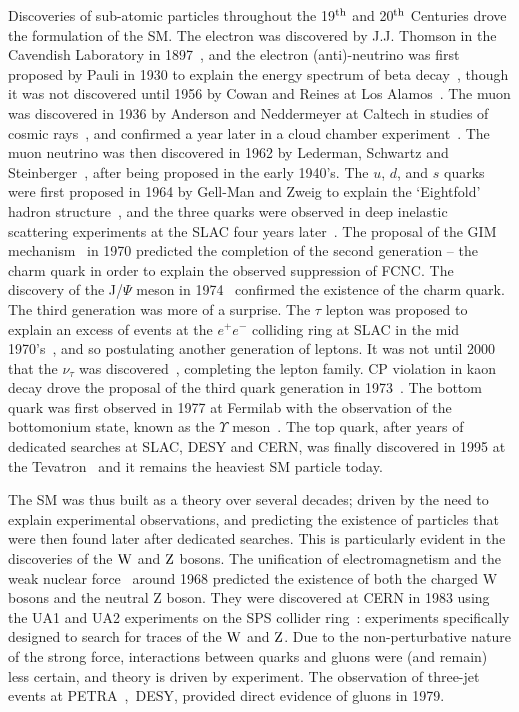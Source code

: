 %
Discoveries of sub-atomic particles throughout the 19$^{\rm th}$ and 20$^{\rm th}$ Centuries drove the formulation of the \ac{SM}.
The electron was discovered by J.J. Thomson in the Cavendish Laboratory in 1897~\cite{JJThomson}, and the electron (anti)-neutrino was first proposed by Pauli in 1930 to explain the energy spectrum of beta decay~\cite{PauliLetter}, though it was not discovered until 1956 by Cowan and Reines at Los Alamos~\cite{CowanReines}.
The muon was discovered in 1936 by Anderson and Neddermeyer at Caltech in studies of cosmic rays~\cite{muon1}, and confirmed a year later in a cloud chamber experiment~\cite{muon2}.
The muon neutrino was then discovered in 1962 by Lederman, Schwartz and Steinberger~\cite{muonNeutrino}, after being proposed in the early 1940's.
The $u$, $d$, and $s$ quarks were first proposed in 1964 by Gell-Man and Zweig to explain the `Eightfold' hadron structure~\cite{GellMann:1964nj,Zweig:1964jf},
and the three quarks were observed in deep inelastic scattering experiments at the \ac{SLAC} four years later~\cite{SLAC1,SLAC2}.
The proposal of the GIM mechanism~\cite{PhysRevD.2.1285} in 1970 predicted the completion of the second generation -- the charm quark in order to explain the observed suppression of \ac{FCNC}.
The discovery of the J/$\Psi$ meson in 1974~\cite{jpsi1,jpsi2} confirmed the existence of the charm quark.
%
The third generation was more of a surprise. 
The $\tau$ lepton was proposed to explain an excess of events at the $e^{+}e^{-}$ colliding ring at \ac{SLAC} in the mid 1970's~\cite{tauDiscovery}, and so postulating another generation of leptons. 
It was not until 2000 that the $\nu_\tau$ was discovered~\cite{tauNeutrino}, completing the lepton family. 
CP violation in kaon decay drove the proposal of the third quark generation in 1973~\cite{Kobayashi01021973}.
The bottom quark was first observed in 1977 at Fermilab with the observation of the bottomonium state, known as the $\Upsilon$ meson~\cite{bottomonium}. 
The top quark, after years of dedicated searches at \ac{SLAC}, \ac{DESY} and \ac{CERN}, was finally discovered in 1995 at the Tevatron~\cite{topquark:CDF,topquark:D0} and it remains the heaviest \ac{SM} particle today.

%
The \ac{SM} was thus built as a theory over several decades; driven by the need to explain experimental observations, and predicting the existence of particles that were then found later after dedicated searches. 
This is particularly evident in the discoveries of the $\mathrm{W}$ and $\mathrm{Z}$ bosons. 
The unification of electromagnetism and the weak nuclear force~\cite{PhysRevLett.19.1264,Glashow:1961tr,Salam:1968rm} around 1968 predicted the existence of both the charged W bosons and the neutral Z boson.
They were discovered at \ac{CERN} in 1983 using the UA1 and UA2 experiments on the \ac{SPS} collider ring~\cite{UA1:W,UA2:W,UA1:Z,UA2:Z}: experiments specifically designed to search for traces of the $\mathrm{W}$ and $\mathrm{Z}$.
Due to the non-perturbative nature of the strong force, interactions between quarks and gluons were (and remain) less certain, and theory is driven by experiment.	
The observation of three-jet events at PETRA~\cite{gluon:3jet1, gluon:3jet2},~\ac{DESY}, provided direct evidence of gluons in 1979. 



